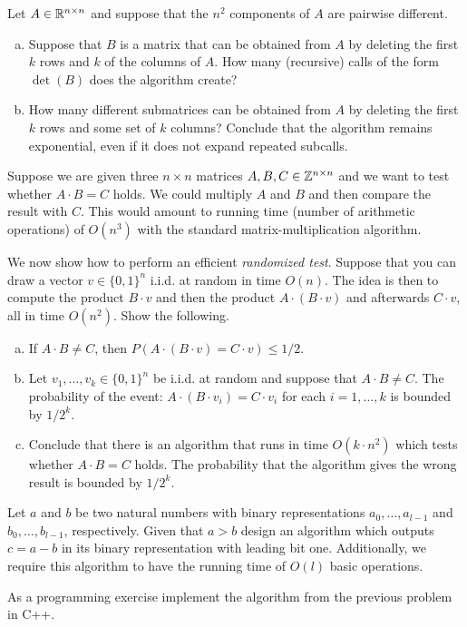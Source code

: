 \documentclass[11pt]{article}
\begin{document}
\newpage

Let $A \in \mathbb{R}^{n \times n}$  and suppose that the $n^2$ components of $A$ are pairwise different.
\begin{enumerate}[a)]
\item
Suppose that $B$ is a matrix that can be obtained from $A$ by deleting the first $k$ rows and $k$ of the columns of $A$. How many (recursive) calls of the form $\det(B)$ does the algorithm create? 

\item How many different submatrices can be obtained from $A$ by deleting the first $k$ rows and some set of $k$ columns? Conclude that the algorithm remains exponential, even if it does not expand repeated subcalls. 
\end{enumerate}

\problem Suppose we are given three $n \times n$ matrices $A,B,C \in \mathbb{Z}^{n \times n}$ and we want to test whether $A \cdot B = C$ holds. We could multiply $A$ and $B$ and then compare the result with $C$. This would amount to running time (number of arithmetic operations) of $O(n^3)$ with the standard matrix-multiplication algorithm. 

We now show how to perform an efficient \emph{randomized test}. Suppose that you can draw a vector $v \in \{0,1\}^n$  i.i.d. at random in time $O(n)$. The idea is then to compute the product $B \cdot v$ and then the product $A \cdot (B \cdot v)$ and afterwards $C \cdot v$, all in time $O(n^2)$. Show the following. 

\begin{enumerate}[a)]
\item If $A \cdot B \neq C$, then $P(A \cdot (B \cdot v) = C \cdot v) \leq 1/2$. 
\item Let $v_1,\dots,v_k \in \{0,1\}^n$ be i.i.d. at random and suppose that  $A \cdot B \neq C$. The probability of the event: $A \cdot (B \cdot v_i) = C \cdot v_i$ for each $i=1,\dots,k$ is bounded by $1/2^k$. 
\item Conclude that there is an algorithm that runs in time $O(k \cdot n^2)$ which tests whether $A \cdot B = C$ holds. The probability that the algorithm gives the wrong result is bounded by $1/2^k$. 
\end{enumerate}

\problemstar Let $a$ and $b$ be two natural numbers with binary representations 
   $a_0,\dots,a_{l-1}$ and $b_0,\dots,b_{l-1}$, respectively. Given that $a > b$ design an algorithm which outputs $c=a-b$ in its binary representation with leading bit one. Additionally,
   we require this algorithm to have the running time of $O(l)$ basic operations. 

\problem
As a programming exercise implement the algorithm from the previous problem in C++.
\end{document}
